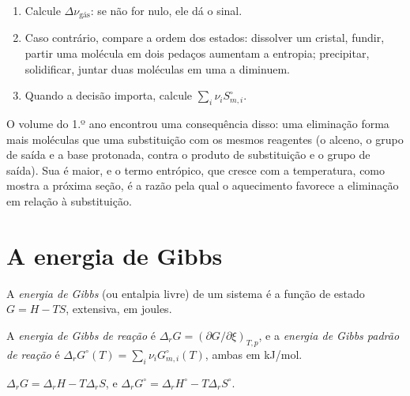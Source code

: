 \begin{method}\label{met:b2:reaction-free-energy:entropy-sign}
\begin{enumerate}
  \item Calcule $\Delta\nu_{\text{gás}}$: se não for nulo, ele dá o
        sinal.
  \item Caso contrário, compare a ordem dos estados: dissolver um cristal,
        fundir, partir uma molécula em dois pedaços aumentam a entropia;
        precipitar, solidificar, juntar duas moléculas em uma a diminuem.
  \item Quando a decisão importa, calcule $\sum_i\nu_iS^\circ_{m,i}$.
\end{enumerate}
\end{method}

O volume do 1.º ano encontrou uma consequência disso: uma eliminação forma
mais moléculas que uma substituição com os mesmos reagentes (o alceno, o
grupo de saída e a base protonada, contra o produto de substituição e o
grupo de saída). Sua  é maior, e o termo entrópico, que
cresce com a temperatura, como mostra a próxima seção, é a razão pela qual
o aquecimento favorece a eliminação em relação à substituição.

\section{A energia de Gibbs}

\begin{definition}\label{def:b2:reaction-free-energy:gibbs-energy}
A \emph{energia de Gibbs} (ou entalpia livre) de um sistema
é a função de estado $G = H - TS$, extensiva, em joules.
\end{definition}

\begin{definition}\label{def:b2:reaction-free-energy:reaction-gibbs}
A \emph{energia de Gibbs de reação} é $\Delta_r G
= (\partial G/\partial\xi)_{T,p}$, e a \emph{energia de Gibbs padrão de
reação} é $\Delta_r G^\circ(T) =
\sum_i\nu_iG^\circ_{m,i}(T)$, ambas em \unit{kJ/mol}.
\end{definition}

\begin{proposition}\label{prop:b2:reaction-free-energy:g-h-s}
$\Delta_r G = \Delta_r H - T\Delta_r S$, e $\Delta_r G^\circ = \Delta_r
H^\circ - T\Delta_r S^\circ$.
\end{proposition}


